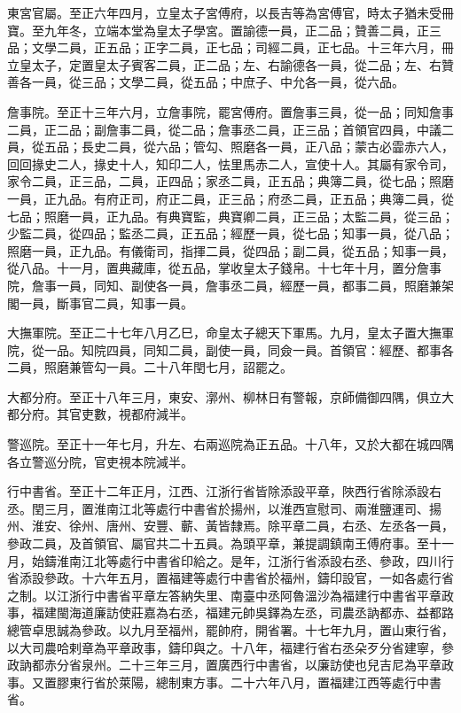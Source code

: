 \begin{pinyinscope}
 東宮官屬。至正六年四月，立皇太子宮傅府，以長吉等為宮傅官，時太子猶未受冊寶。至九年冬，立端本堂為皇太子學宮。置諭德一員，正二品；贊善二員，正三品；文學二員，正五品；正字二員，正七品；司經二員，正七品。十三年六月，冊立皇太子，定置皇太子賓客二員，正二品；左、右諭德各一員，從二品；左、右贊善各一員，從三品；文學二員，從五品；中庶子、中允各一員，從六品。



 詹事院。至正十三年六月，立詹事院，罷宮傅府。置詹事三員，從一品；同知詹事二員，正二品；副詹事二員，從二品；詹事丞二員，正三品；首領官四員，中議二員，從五品；長史二員，從六品；管勾、照磨各一員，正八品；蒙古必霝赤六人，回回掾史二人，掾史十人，知印二人，怯里馬赤二人，宣使十人。其屬有家令司，家令二員，正三品，二員，正四品；家丞二員，正五品；典簿二員，從七品；照磨一員，正九品。有府正司，府正二員，正三品；府丞二員，正五品；典簿二員，從七品；照磨一員，正九品。有典寶監，典寶卿二員，正三品；太監二員，從三品；少監二員，從四品；監丞二員，正五品；經歷一員，從七品；知事一員，從八品；照磨一員，正九品。有儀衛司，指揮二員，從四品；副二員，從五品；知事一員，從八品。十一月，置典藏庫，從五品，掌收皇太子錢帛。十七年十月，置分詹事院，詹事一員，同知、副使各一員，詹事丞二員，經歷一員，都事二員，照磨兼架閣一員，斷事官二員，知事一員。



 大撫軍院。至正二十七年八月乙巳，命皇太子總天下軍馬。九月，皇太子置大撫軍院，從一品。知院四員，同知二員，副使一員，同僉一員。首領官：經歷、都事各二員，照磨兼管勾一員。二十八年閏七月，詔罷之。



 大都分府。至正十八年三月，東安、漷州、柳林日有警報，京師備御四隅，俱立大都分府。其官吏數，視都府減半。



 警巡院。至正十一年七月，升左、右兩巡院為正五品。十八年，又於大都在城四隅各立警巡分院，官吏視本院減半。



 行中書省。至正十二年正月，江西、江浙行省皆除添設平章，陜西行省除添設右丞。閏三月，置淮南江北等處行中書省於揚州，以淮西宣慰司、兩淮鹽運司、揚州、淮安、徐州、唐州、安豐、蘄、黃皆隸焉。除平章二員，右丞、左丞各一員，參政二員，及首領官、屬官共二十五員。為頭平章，兼提調鎮南王傅府事。至十一月，始鑄淮南江北等處行中書省印給之。是年，江浙行省添設右丞、參政，四川行省添設參政。十六年五月，置福建等處行中書省於福州，鑄印設官，一如各處行省之制。以江浙行中書省平章左答納失里、南臺中丞阿魯溫沙為福建行中書省平章政事，福建閩海道廉訪使莊嘉為右丞，福建元帥吳鐸為左丞，司農丞訥都赤、益都路總管卓思誠為參政。以九月至福州，罷帥府，開省署。十七年九月，置山東行省，以大司農哈剌章為平章政事，鑄印與之。十八年，福建行省右丞朵歹分省建寧，參政訥都赤分省泉州。二十三年三月，置廣西行中書省，以廉訪使也兒吉尼為平章政事。又置膠東行省於萊陽，總制東方事。二十六年八月，置福建江西等處行中書省。




\end{pinyinscope}

